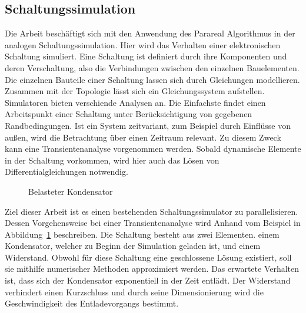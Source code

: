 \subsection*{Schaltungssimulation}
Die Arbeit beschäftigt sich mit den Anwendung des Parareal Algorithmus in der analogen Schaltungssimulation. Hier wird das Verhalten einer elektronischen Schaltung simuliert. Eine Schaltung ist definiert durch ihre Komponenten und deren Verschaltung, also die Verbindungen zwischen den einzelnen Bauelementen. Die einzelnen Bauteile einer Schaltung lassen sich durch Gleichungen modellieren. Zusammen mit der Topologie lässt sich ein Gleichungssystem aufstellen.\\

Simulatoren bieten verschiende Analysen an. Die Einfachste findet einen Arbeitspunkt einer Schaltung unter Berücksichtigung von gegebenen Randbedingungen. Ist ein System zeitvariant, zum Beispiel durch Einflüsse von außen, wird die Betrachtung über einen Zeitraum relevant. Zu diesem Zweck kann eine Transientenanalyse vorgenommen werden. Sobald dynamische Elemente in der Schaltung vorkommen, wird hier auch das Lösen von Differentialgleichungen notwendig.\\
\begin{figure}[ht]
    \centering
        \begin{circuitikz}[scale=1.0]
            
        \end{circuitikz}
    \caption{Belasteter Kondensator}
\label{fig:cap}
\end{figure}
Ziel dieser Arbeit ist es einen bestehenden Schaltungssimulator zu parallelisieren. Dessen Vorgehensweise bei einer Transientenanalyse wird Anhand vom Beispiel in Abbildung~\ref{fig:cap} beschreiben. Die Schaltung besteht aus zwei Elementen. einem Kondensator, welcher zu Beginn der Simulation geladen ist, und einem Widerstand. Obwohl für diese Schaltung eine geschlossene Lösung existiert, soll sie mithilfe numerischer Methoden approximiert werden. Das erwartete Verhalten ist, dass sich der Kondensator exponentiell in der Zeit entlädt. Der Widerstand verhindert einen Kurzschluss und durch seine Dimensionierung wird die Geschwindigkeit des Entladevorgangs bestimmt.


